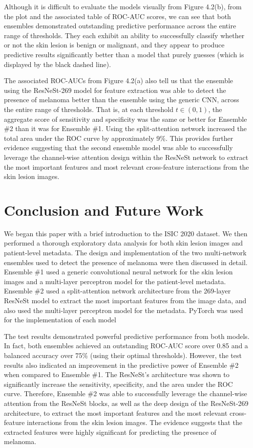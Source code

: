 \documentclass [MAS] {uclathes}
\begin{document}
Although it is difficult to evaluate the models visually from Figure 4.2(b), from the plot and the associated table of ROC-AUC scores, we can see that both ensembles demonstrated outstanding predictive performance across the entire range of thresholds. They each exhibit an ability to successfully classify whether or not the skin lesion is benign or malignant, and they appear to produce predictive results significantly better than a model that purely guesses (which is displayed by the black dashed line).

The associated ROC-AUCs from Figure 4.2(a) also tell us that the ensemble using the ResNeSt-269 model for feature extraction was able to detect the presence of melanoma better than the ensemble using the generic CNN, across the entire range of thresholds. That is, at each threshold $t \in (0, 1)$, the aggregate score of sensitivity and specificity was the same or better for Ensemble \#2 than it was for Ensemble \#1. Using the split-attention network increased the total area under the ROC curve by approximately 9\%. This provides further evidence suggesting that the second ensemble model was able to successfully leverage the channel-wise attention design within the ResNeSt network to extract the most important features and most relevant cross-feature interactions from the skin lesion images.

\chapter{Conclusion and Future Work}

We began this paper with a brief introduction to the ISIC 2020 dataset. We then performed a thorough exploratory data analysis for both skin lesion images and patient-level metadata. The design and implementation of the two multi-network ensembles used to detect the presence of melanoma were then discussed in detail. Ensemble \#1 used a generic convolutional neural network for the skin lesion images and a multi-layer perceptron model for the patient-level metadata. Ensemble \#2 used a split-attention network architecture from the 269-layer ResNeSt model to extract the most important features from the image data, and also used the multi-layer perceptron model for the metadata. PyTorch was used for the implementation of each model \cite{NEURIPS2019_9015}

The test results demonstrated powerful predictive performance from both models. In fact, both ensembles achieved an outstanding ROC-AUC score over 0.85 and a balanced accuracy over 75\% (using their optimal thresholds). However, the test results also indicated an improvement in the predictive power of Ensemble \#2 when compared to Ensemble \#1. The ResNeSt's architecture was shown to significantly increase the sensitivity, specificity, and the area under the ROC curve. Therefore, Ensemble \#2 was able to successfully leverage the channel-wise attention from the ResNeSt blocks, as well as the deep design of the ResNeSt-269 architecture, to extract the most important features and the most relevant cross-feature interactions from the skin lesion images. The evidence suggests that the extracted features were highly significant for predicting the presence of melanoma.
\end{document}
